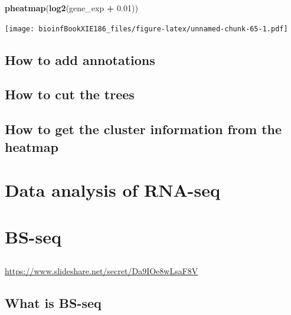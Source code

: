 \documentclass[]{book}
\makeatletter
\newenvironment{Shaded}{\begin{snugshade}}{\end{snugshade}}
\newcommand{\KeywordTok}[1]{\textcolor[rgb]{0.13,0.29,0.53}{\textbf{#1}}}
\newcommand{\FloatTok}[1]{\textcolor[rgb]{0.00,0.00,0.81}{#1}}
\newcommand{\StringTok}[1]{\textcolor[rgb]{0.31,0.60,0.02}{#1}}
\newcommand{\OperatorTok}[1]{\textcolor[rgb]{0.81,0.36,0.00}{\textbf{#1}}}
\newcommand{\NormalTok}[1]{#1}
\newenvironment{kframe}{%
\medskip{}
\setlength{\fboxsep}{.8em}
 \def\at@end@of@kframe{}%
 \ifinner\ifhmode%
  \def\at@end@of@kframe{\end{minipage}}%
  \begin{minipage}{\columnwidth}%
 \fi\fi%
 \def\FrameCommand##1{\hskip\@totalleftmargin \hskip-\fboxsep
 \colorbox{shadecolor}{##1}\hskip-\fboxsep
     \hskip-\linewidth \hskip-\@totalleftmargin \hskip\columnwidth}%
 \MakeFramed {\advance\hsize-\width
   \@totalleftmargin\z@ \linewidth\hsize
   \@setminipage}}%
 {\par\unskip\endMakeFramed%
 \at@end@of@kframe}
\renewenvironment{Shaded}{\begin{kframe}}{\end{kframe}}
\theoremstyle{definition}
\theoremstyle{definition}
\theoremstyle{definition}
\theoremstyle{remark}
\makeatother
\begin{document}
\begin{Shaded}
\begin{Highlighting}[]
\KeywordTok{pheatmap}\NormalTok{(}\KeywordTok{log2}\NormalTok{(gene_exp }\OperatorTok{+}\StringTok{ }\FloatTok{0.01}\NormalTok{)) }
\end{Highlighting}
\end{Shaded}

\texttt{[image: bioinfBookXIE186\_files/figure-latex/unnamed-chunk-65-1.pdf]}

\section{How to add annotations}\label{how-to-add-annotations}

\section{How to cut the trees}\label{how-to-cut-the-trees}

\section{How to get the cluster information from the
heatmap}\label{how-to-get-the-cluster-information-from-the-heatmap}

\section{}\label{section-7}

\chapter{Data analysis of RNA-seq}\label{data-analysis-of-rna-seq}

\chapter{BS-seq}\label{bs-seq}

\section{}\label{section-8}

\url{https://www.slideshare.net/secret/Da9IOe8wLsaF8V}

\section{What is BS-seq}\label{what-is-bs-seq}
\end{document}
